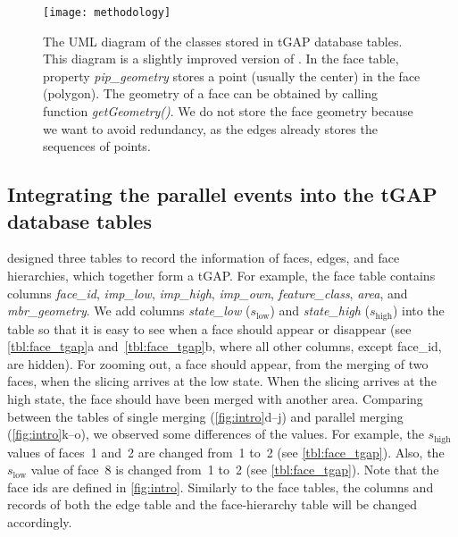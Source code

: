 \documentclass[]{interact}
\begin{document}
\begin{figure}[tb]
\centering
\texttt{[image: methodology]}
\caption{The UML diagram of the classes stored in tGAP database tables.
This diagram is a slightly improved version of \citet[]{Meijers2011Thesis}.
In the face table, property \emph{pip\_geometry} 
stores a point (usually the center) in the face (polygon).
The geometry of a face can be obtained by calling function \emph{getGeometry()}.
We do not store the face geometry because we want to avoid redundancy,
as the edges already stores the sequences of points.
}
\label{fig:uml_tgap}
\end{figure}


\subsection{Integrating the parallel events into the tGAP database tables}
\label{sec:integrate_tgap}

\citet[]{Meijers2011Thesis} designed three tables 
to record the information of
faces, edges, and face hierarchies, 
which together form a tGAP.
For example, the face table contains columns \emph{face\_id}, 
\emph{imp\_low}, \emph{imp\_high}, \emph{imp\_own},
\emph{feature\_class}, \emph{area}, and \emph{mbr\_geometry}.
We add columns \emph{state\_low} ($s_\mathrm{low}$) 
and \emph{state\_high} ($s_\mathrm{high}$) into the table 
so that it is easy to see when a face should appear or disappear 
(see \tabls\ref{tbl:face_tgap}a and~\ref{tbl:face_tgap}b,
where all other columns, except face\_id, are hidden).
For zooming out, a face should appear, 
from the merging of two faces,
when the slicing arrives at the low state.
When the slicing arrives at the high state,
the face should have been merged with another area.
Comparing between the tables of single merging 
(\figs\ref{fig:intro}d--j)
and parallel merging (\figs\ref{fig:intro}k--o),
we observed some differences of the values.
For example, the $s_\mathrm{high}$ values of faces~1 and~2 are changed from~1 to~2
(see \tabl\ref{tbl:face_tgap}).
Also, the $s_\mathrm{low}$ value of face~8 is changed from~1 to~2
(see \tabl\ref{tbl:face_tgap}).
Note that the face ids are defined in \fig\ref{fig:intro}.
Similarly to the face tables, 
the columns and records of both the edge table and the face-hierarchy table 
will be changed accordingly.
\end{document}
